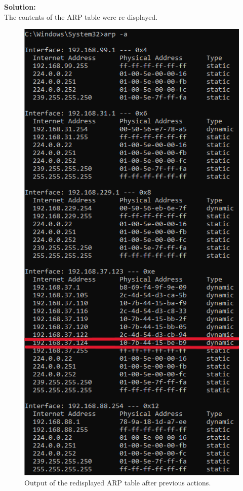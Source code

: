 \documentclass[a4paper,12pt]{article}
\begin{document}
\textbf{Solution:} \\
The contents of the ARP table were re-displayed.
\begin{figure}[H]
\centering
\includegraphics[width=\linewidth, height=0.55\textheight, keepaspectratio]{Pictures_Lab1/obj3 arp table .png}
\caption{Output of the redisplayed ARP table after previous actions.}
\end{figure}
\end{document}
